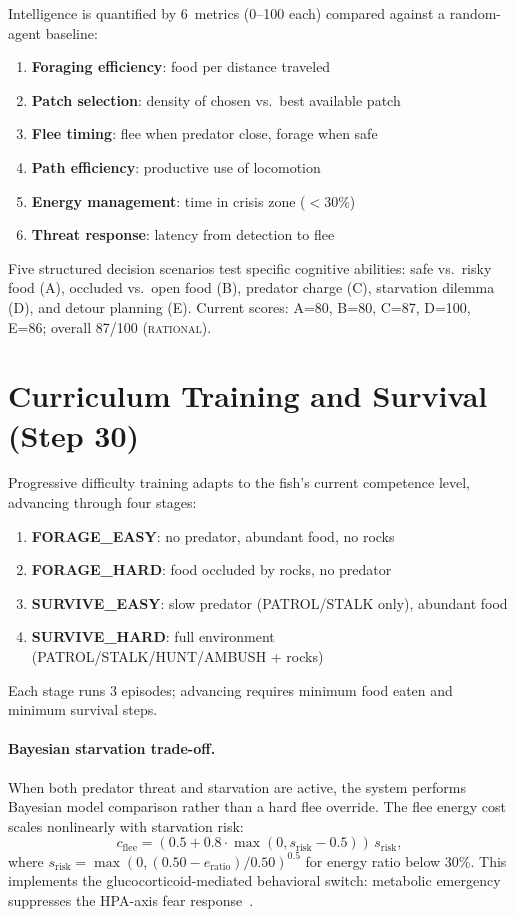 \documentclass[11pt,a4paper]{article}
\begin{document}
Intelligence is quantified by 6~metrics (0--100 each) compared against
a random-agent baseline:
\begin{enumerate}[nosep]
  \item \textbf{Foraging efficiency}: food per distance traveled
  \item \textbf{Patch selection}: density of chosen vs.\ best available patch
  \item \textbf{Flee timing}: flee when predator close, forage when safe
  \item \textbf{Path efficiency}: productive use of locomotion
  \item \textbf{Energy management}: time in crisis zone ($<30\%$)
  \item \textbf{Threat response}: latency from detection to flee
\end{enumerate}

Five structured decision scenarios test specific cognitive abilities:
safe vs.\ risky food (A), occluded vs.\ open food (B), predator charge
(C), starvation dilemma (D), and detour planning (E).
Current scores: A=80, B=80, C=87, D=100, E=86; overall 87/100
(\textsc{rational}).

\section{Curriculum Training and Survival (Step 30)}\label{sec:curriculum_survival}

Progressive difficulty training adapts to the fish's current
competence level, advancing through four stages:
\begin{enumerate}[nosep]
  \item \textbf{FORAGE\_EASY}: no predator, abundant food, no rocks
  \item \textbf{FORAGE\_HARD}: food occluded by rocks, no predator
  \item \textbf{SURVIVE\_EASY}: slow predator (PATROL/STALK only), abundant food
  \item \textbf{SURVIVE\_HARD}: full environment (PATROL/STALK/HUNT/AMBUSH + rocks)
\end{enumerate}
Each stage runs 3 episodes; advancing requires minimum food eaten and
minimum survival steps.

\paragraph{Bayesian starvation trade-off.}
When both predator threat and starvation are active, the system performs
Bayesian model comparison rather than a hard flee override.
The flee energy cost scales nonlinearly with starvation risk:
\begin{equation}\label{eq:flee_energy_cost}
  c_\text{flee} = (0.5 + 0.8\cdot\max(0, s_\text{risk} - 0.5))\,s_\text{risk},
\end{equation}
where $s_\text{risk} = \max(0, (0.50 - e_\text{ratio})/0.50)^{0.5}$ for
energy ratio below 30\%.  This implements the glucocorticoid-mediated
behavioral switch: metabolic emergency suppresses the HPA-axis fear
response~\cite{wendelaar1997}.
\end{document}
